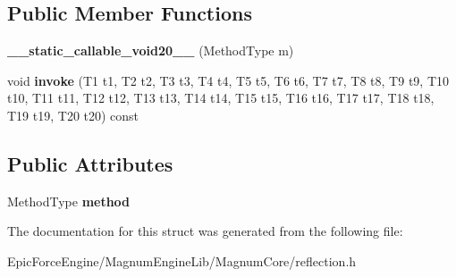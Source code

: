 \subsection*{Public Member Functions}
\begin{DoxyCompactItemize}
\item 
{\bfseries \+\_\+\+\_\+static\+\_\+callable\+\_\+void20\+\_\+\+\_\+} (Method\+Type m)\hypertarget{structagm_1_1reflection_1_1____static__callable__void20_____a526a0e78389d9b03242b179248cbb695}{}\label{structagm_1_1reflection_1_1____static__callable__void20_____a526a0e78389d9b03242b179248cbb695}

\item 
void {\bfseries invoke} (T1 t1, T2 t2, T3 t3, T4 t4, T5 t5, T6 t6, T7 t7, T8 t8, T9 t9, T10 t10, T11 t11, T12 t12, T13 t13, T14 t14, T15 t15, T16 t16, T17 t17, T18 t18, T19 t19, T20 t20) const \hypertarget{structagm_1_1reflection_1_1____static__callable__void20_____a0d1fffe3bcb3a66a63fba5e5097b1892}{}\label{structagm_1_1reflection_1_1____static__callable__void20_____a0d1fffe3bcb3a66a63fba5e5097b1892}

\end{DoxyCompactItemize}
\subsection*{Public Attributes}
\begin{DoxyCompactItemize}
\item 
Method\+Type {\bfseries method}\hypertarget{structagm_1_1reflection_1_1____static__callable__void20_____a9cf1040685226ab3720eb8d4d55c291c}{}\label{structagm_1_1reflection_1_1____static__callable__void20_____a9cf1040685226ab3720eb8d4d55c291c}

\end{DoxyCompactItemize}


The documentation for this struct was generated from the following file\+:\begin{DoxyCompactItemize}
\item 
Epic\+Force\+Engine/\+Magnum\+Engine\+Lib/\+Magnum\+Core/reflection.\+h\end{DoxyCompactItemize}
